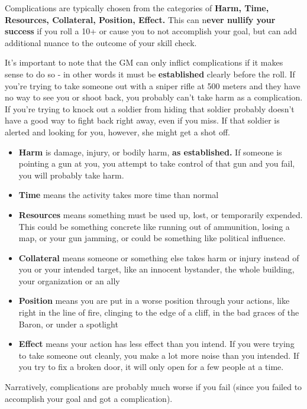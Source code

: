 Complications are typically chosen from the categories of \textbf{Harm, Time, Resources, Collateral, Position, Effect.} This can n\textbf{ever nullify your success} if you roll a 10+ or cause you to not accomplish your goal, but can add additional nuance to the outcome of your skill check.


It's important to note that the GM can only inflict complications if it makes sense to do so - in other words it must be \textbf{established} clearly before the roll. If you're trying to take someone out with a sniper rifle at 500 meters and they have no way to see you or shoot back, you probably can't take harm as a complication. If you're trying to knock out a soldier from hiding that soldier probably doesn't have a good way to fight back right away, even if you miss. If that soldier is alerted and looking for you, however, she might get a shot off.

\begin{itemize}
\item \textbf{Harm} is damage, injury, or bodily harm, \textbf{as established.} If someone is pointing a gun at you, you attempt to take control of that gun and you fail, you will probably take harm.
\item \textbf{Time} means the activity takes more time than normal
\item \textbf{Resources} means something must be used up, lost, or temporarily expended. This could be something concrete like running out of ammunition, losing a map, or your gun jamming, or could be something like political influence.
\item \textbf{Collateral} means someone or something else takes harm or injury instead of you or your intended target, like an innocent bystander, the whole building, your organization or an ally
\item \textbf{Position} means you are put in a worse position through your actions, like right in the line of fire, clinging to the edge of a cliff, in the bad graces of the Baron, or under a spotlight
\item \textbf{Effect} means your action has less effect than you intend. If you were trying to take someone out cleanly, you make a lot more noise than you intended. If you try to fix a broken door, it will only open for a few people at a time.
\end{itemize}  

Narratively, complications are probably much worse if you fail (since you failed to accomplish your goal and got a complication). 

